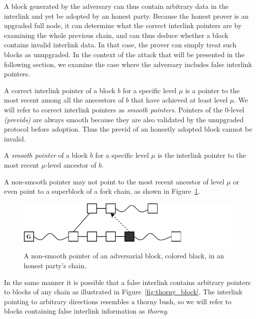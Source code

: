 A block generated by the adversary can thus contain arbitrary data in the interlink and yet be adopted by an honest party. Because the honest prover is an upgraded full node, it can determine what the correct interlink pointers are by examining the whole previous chain, and can thus deduce whether a block contains invalid interlink data. In that case, the prover can simply treat such blocks as unupgraded. In the context of the attack that will be presented in the following section, we examine the case where the adversary includes false interlink pointers.

A correct interlink pointer of a block $b$ for a specific level $\mu$ is a pointer to the most recent among all the anecestors of $b$ that have achieved at least level $\mu$. We will refer to correct interlink pointers as \emph{smooth pointers}. Pointers of the 0-level \textit{(previds)} are always smooth because they are also validated by the unupgraded protocol before adoption. Thus the previd of an
honestly adopted block cannot be invalid.

\begin{definition}
  A \emph{smooth pointer} of a block $b$ for a specific level $\mu$ is the interlink pointer to the most recent $\mu$-level ancestor of $b$.
	\label{defn:smooth_pointer}
\end{definition}

A non-smooth pointer may not point to the most recent ancestor of level $\mu$ or even point to a superblock of a fork chain, as shown in Figure~\ref{fig:false_interlink}.

\begin{figure}[h]
	\begin{center}
		\includegraphics[width=0.9\columnwidth]{figures/false_interlink.pdf}
	\end{center}
    \caption{A non-smooth pointer of an adversarial block, colored black, in an honest party's chain.}
	\label{fig:false_interlink}
\end{figure}

In the same manner it is possible that a false interlink contains arbitrary pointers to blocks of any chain as illustrated in Figure~\ref{fig:thorny_block}. The interlink pointing to arbitrary directions resembles a thorny bush, so we will refer to blocks containing false interlink information as \emph{thorny}.

